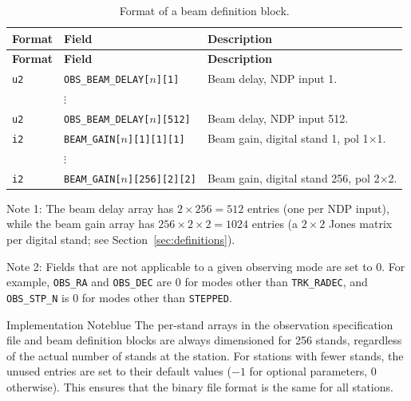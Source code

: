 \begin{longtable}{|l|l|p{8cm}|}
\caption{Format of a beam definition block.}
\label{tab:beam-format} \\
\hline
\textbf{Format} & \textbf{Field} & \textbf{Description} \\
\hline
\endfirsthead

\hline
\textbf{Format} & \textbf{Field} & \textbf{Description} \\
\hline
\endhead

\hline
\endfoot

\texttt{u2} & \texttt{OBS\_BEAM\_DELAY[$n$][1]}       & Beam delay, NDP input 1. \\
\hline
             & $\vdots$                                & \\
\hline
\texttt{u2} & \texttt{OBS\_BEAM\_DELAY[$n$][512]}     & Beam delay, NDP input 512. \\
\hline
\texttt{i2} & \texttt{BEAM\_GAIN[$n$][1][1][1]}       & Beam gain, digital stand 1, pol 1$\times$1. \\
\hline
             & $\vdots$                                & \\
\hline
\texttt{i2} & \texttt{BEAM\_GAIN[$n$][256][2][2]}     & Beam gain, digital stand 256, pol 2$\times$2. \\
\hline

\end{longtable}

\begin{noteBox}
Note 1: The beam delay array has $2 \times 256 = 512$ entries (one per NDP input), while the beam gain array has $256 \times 2 \times 2 = 1024$ entries (a $2\times 2$ Jones matrix per digital stand; see Section~\ref{sec:definitions}).
\end{noteBox}

\begin{noteBox}
Note 2: Fields that are not applicable to a given observing mode are set to 0.  For example, \texttt{OBS\_RA} and \texttt{OBS\_DEC} are 0 for modes other than \texttt{TRK\_RADEC}, and \texttt{OBS\_STP\_N} is 0 for modes other than \texttt{STEPPED}.
\end{noteBox}

\begin{calloutBox}{Implementation Note}{blue}
The per-stand arrays in the observation specification file and beam definition blocks are always dimensioned for 256 stands, regardless of the actual number of stands at the station.  For stations with fewer stands, the unused entries are set to their default values ($-1$ for optional parameters, 0 otherwise).  This ensures that the binary file format is the same for all stations.
\end{calloutBox}
